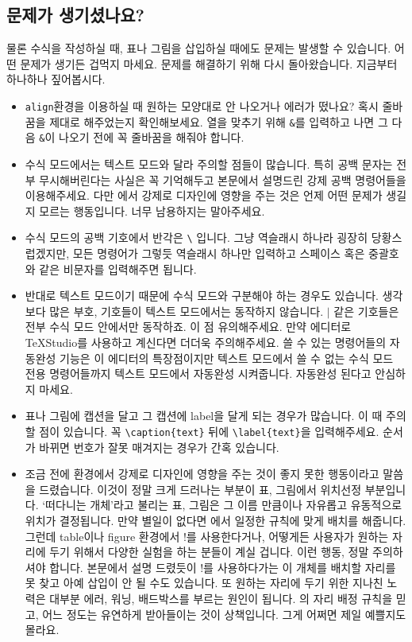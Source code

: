 \subsection{문제가 생기셨나요?}
\label{subsec:problem4}
물론 수식을 작성하실 때, 표나 그림을 삽입하실 때에도 문제는 발생할 수 있습니다.
어떤 문제가 생기든 겁먹지 마세요.
문제를 해결하기 위해 다시 돌아왔습니다.
지금부터 하나하나 짚어봅시다.
\begin{itemize}
	\item \verb|align|환경을 이용하실 때 원하는 모양대로 안 나오거나 에러가 떴나요?
	혹시 줄바꿈을 제대로 해주었는지 확인해보세요.
	열을 맞추기 위해 \verb|&|를 입력하고 나면 그 다음 \verb|&|이 나오기 전에 꼭 줄바꿈을 해줘야 합니다.

	\item 수식 모드에서는 텍스트 모드와 달라 주의할 점들이 많습니다.
	특히 공백 문자는 전부 무시해버린다는 사실은 꼭 기억해두고 본문에서 설명드린 강제 공백 명령어들을 이용해주세요.
	다만 \lt 에서 강제로 디자인에 영향을 주는 것은 언제 어떤 문제가 생길지 모르는 행동입니다.
	너무 남용하지는 말아주세요.
	
	\item 수식 모드의 공백 기호에서 반각은 \verb|\| 입니다.
	그냥 역슬래시 하나라 굉장히 당황스럽겠지만, 모든 명령어가 그렇듯 역슬래시 하나만 입력하고 스페이스 혹은 중괄호와 같은 비문자를 입력해주면 됩니다.
	
	\item 반대로 텍스트 모드이기 때문에 수식 모드와 구분해야 하는 경우도 있습니다.
	생각보다 많은 부호, 기호들이 텍스트 모드에서는 동작하지 않습니다.
	$\mid$ 같은 기호들은 전부 수식 모드 안에서만 동작하죠.
	이 점 유의해주세요.
	만약 에디터로 \TeX Studio를 사용하고 계신다면 더더욱 주의해주세요.
	쓸 수 있는 명령어들의 자동완성 기능은 이 에디터의 특장점이지만 텍스트 모드에서 쓸 수 없는 수식 모드 전용 명령어들까지 텍스트 모드에서 자동완성 시켜줍니다.
	자동완성 된다고 안심하지 마세요.
	
	\item 표나 그림에 캡션을 달고 그 캡션에 label을 달게 되는 경우가 많습니다.
	이 때 주의할 점이 있습니다.
	꼭 \verb|\caption{text}| 뒤에 \verb|\label{text}|을 입력해주세요.
	순서가 바뀌면 번호가 잘못 매겨지는 경우가 간혹 있습니다.
	
	\item 조금 전에 \lt 환경에서 강제로 디자인에 영향을 주는 것이 좋지 못한 행동이라고 말씀을 드렸습니다.
	이것이 정말 크게 드러나는 부분이 표, 그림에서 위치선정 부분입니다.
	`떠다니는 개체'라고 불리는 표, 그림은 그 이름 만큼이나 자유롭고 유동적으로 위치가 결정됩니다.
	만약 별일이 없다면 \lt 에서 일정한 규칙에 맞게 배치를 해줍니다.
	그런데 table이나 figure 환경에서 !를 사용한다거나, 어떻게든 사용자가 원하는 자리에 두기 위해서 다양한 실험을 하는 분들이 계실 겁니다.
	이런 행동, 정말 주의하셔야 합니다.
	본문에서 설명 드렸듯이 !를 사용하다가는 \lt 이 개체를 배치할 자리를 못 찾고 아예 삽입이 안 될 수도 있습니다.
	또 원하는 자리에 두기 위한 지나친 노력은 대부분 에러, 워닝, 배드박스를 부르는 원인이 됩니다.
	\lt 의 자리 배정 규칙을 믿고, 어느 정도는 유연하게 받아들이는 것이 상책입니다.
	그게 어쩌면 제일 예쁠지도 몰라요.
	

\end{itemize}

